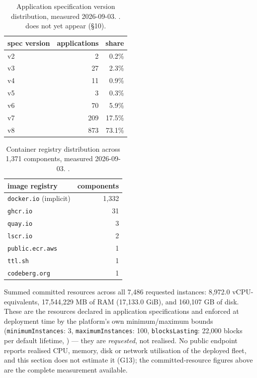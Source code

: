 \begin{table}[H]
\centering
\small
\begin{tabular}{lrr}
\toprule
spec version & applications & share \\
\midrule
v2 & 2 & 0.2\% \\
v3 & 27 & 2.3\% \\
v4 & 11 & 0.9\% \\
v5 & 3 & 0.3\% \\
v6 & 70 & 5.9\% \\
v7 & 209 & 17.5\% \\
v8 & 873 & 73.1\% \\
\bottomrule
\end{tabular}
\caption{Application specification version distribution, measured 2026-09-03.
.  does not yet
appear (\S10).}
\label{tab:eval-appspec}
\end{table}

\begin{table}[H]
\centering
\small
\begin{tabular}{lr}
\toprule
image registry & components \\
\midrule
\texttt{docker.io} (implicit) & 1,332 \\
\texttt{ghcr.io} & 31 \\
\texttt{quay.io} & 3 \\
\texttt{lscr.io} & 2 \\
\texttt{public.ecr.aws} & 1 \\
\texttt{ttl.sh} & 1 \\
\texttt{codeberg.org} & 1 \\
\bottomrule
\end{tabular}
\caption{Container registry distribution across 1,371 components, measured 2026-09-03.
.}
\label{tab:eval-registry}
\end{table}

Summed committed resources across all 7,486 requested instances: 8,972.0 vCPU-equivalents,
17,544,229 MB of RAM (17,133.0 GiB), and 160,107 GB of disk. These are the resources declared in
application specifications and enforced at deployment time by the platform's own minimum/maximum
bounds (\texttt{minimum\allowbreak{}Instances}: 3, \texttt{maximum\allowbreak{}Instances}: 100,
\texttt{blocksLasting}: 22,000 blocks per default lifetime,
) — they are \emph{requested},
not realised. No public endpoint reports realised CPU, memory, disk or network utilisation of the
deployed fleet, and this section does not estimate it (G13); the committed-resource figures above
are the complete measurement available.

